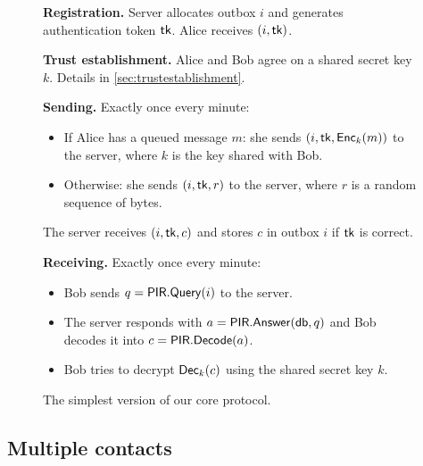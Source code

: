 \begin{figure}
    \begin{framed}
    {\raggedright
        \small
    
    \begin{hangparas}{1em}{1}

        \textbf{Registration.}
            Server allocates outbox $i$ and generates authentication token $\authtoken$.
            Alice receives $(i, \authtoken)$.
    
    \medskip

        \textbf{Trust establishment.}
            Alice and Bob agree on a shared secret key $k$. Details in \cref{sec:trustestablishment}.

            \medskip

        \textbf{Sending.}
            Exactly once every minute: \begin{itemize}
                \item If Alice has a queued message $m$: she sends $(i, \authtoken, \enc_k(m))$ to the server, where $k$ is the key shared with Bob.
                \item Otherwise: she sends $(i, \authtoken, r)$ to the server, where $r$ is a random sequence of bytes.
            \end{itemize}
            The server receives $(i, \authtoken, c)$ and stores $c$ in outbox $i$ if $\authtoken$ is correct.

    \medskip

        
        \textbf{Receiving.} Exactly once every minute:
      \begin{itemize}
        \item Bob sends $q = \mathsf{PIR.Query}(i)$ to the server.
        \item The server responds with $a = \mathsf{PIR.Answer}(\mathsf{db}, q)$ and Bob decodes it into $c = \mathsf{PIR.Decode}(a)$.
        \item Bob tries to decrypt $\mathsf{Dec}_k(c)$ using the shared secret key $k$.
      \end{itemize}
    \end{hangparas}
    }
    \end{framed}
    \caption{The simplest version of our core protocol.}
    \label{fig:simple}
\end{figure}

\subsection{Multiple contacts}

